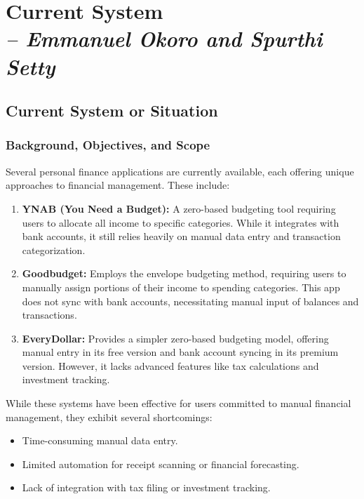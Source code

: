 \chapter{Current System \\
\small{\textit{-- Emmanuel Okoro and Spurthi Setty}}
\label{Chapter::Current System}}

\section{Current System or Situation}

\subsection{Background, Objectives, and Scope}
Several personal finance applications are currently available, each offering unique approaches to financial management. These include:
\begin{enumerate}
    \item \textbf{YNAB (You Need a Budget):} A zero-based budgeting tool requiring users to allocate all income to specific categories. While it integrates with bank accounts, it still relies heavily on manual data entry and transaction categorization.
    \item \textbf{Goodbudget:} Employs the envelope budgeting method, requiring users to manually assign portions of their income to spending categories. This app does not sync with bank accounts, necessitating manual input of balances and transactions.
    \item \textbf{EveryDollar:} Provides a simpler zero-based budgeting model, offering manual entry in its free version and bank account syncing in its premium version. However, it lacks advanced features like tax calculations and investment tracking.
\end{enumerate}

While these systems have been effective for users committed to manual financial management, they exhibit several shortcomings:
\begin{itemize}
    \item Time-consuming manual data entry.
    \item Limited automation for receipt scanning or financial forecasting.
    \item Lack of integration with tax filing or investment tracking.
\end{itemize}

